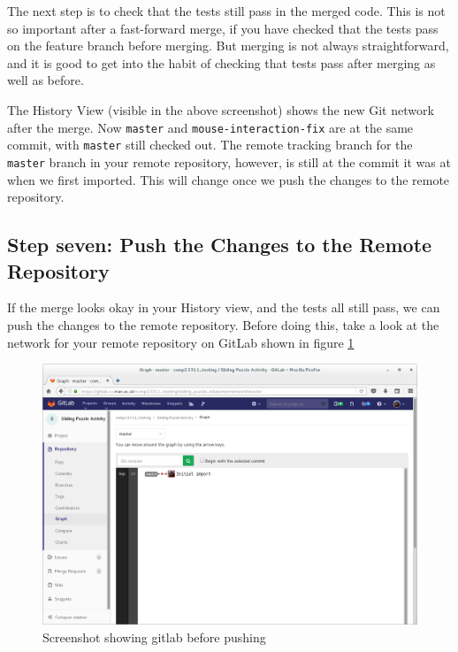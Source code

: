 \documentclass[
]{book}
\begin{document}
The next step is to check that the tests still pass in the merged code. This is not so important after a fast-forward merge, if you have checked that the tests pass on the feature branch before merging. But merging is not always straightforward, and it is good to get into the habit of checking that tests pass after merging as well as before.

The History View (visible in the above screenshot) shows the new Git network after the merge. Now \texttt{master} and \texttt{mouse-interaction-fix} are at the same commit, with \texttt{master} still checked out. The remote tracking branch for the \texttt{master} branch in your remote repository, however, is still at the commit it was at when we first imported. This will change once we push the changes to the remote repository.

\hypertarget{pushingchange}{%
\subsection{Step seven: Push the Changes to the Remote Repository}\label{pushingchange}}

If the merge looks okay in your History view, and the tests all still pass, we can push the changes to the remote repository. Before doing this, take a look at the network for your remote repository on GitLab shown in figure \ref{fig:checkGitLabRemoteBeforePush-fig}

\begin{figure}

{\centering \includegraphics[width=1\linewidth]{images/checkGitLabRemoteBeforePush} 

}

\caption{Screenshot showing gitlab before pushing}\label{fig:checkGitLabRemoteBeforePush-fig}
\end{figure}
\end{document}
